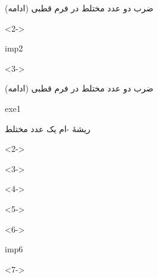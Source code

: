 \def\EMtitlesize{26}\def\EMtitleskip{31}
\begin{frame}{ضرب دو عدد مختلط در فرم قطبی (ادامه)}
\begin{uncoverenv}<2->
\end{uncoverenv}
\EMgap
\begin{EMbox}{imp}{2}{}
\begin{uncoverenv}<3->
\end{uncoverenv}
\end{EMbox}
\end{frame}

\def\EMtitlesize{26}\def\EMtitleskip{31}
\begin{frame}{ضرب دو عدد مختلط در فرم قطبی (ادامه)}
\begin{EMbox}{exe}{1}{}
\end{EMbox}
\end{frame}

\def\EMtitlesize{26}\def\EMtitleskip{31}
\begin{frame}{ریشۀ -ام یک عدد مختلط}
\begin{uncoverenv}<2->
\end{uncoverenv}
\EMgap
\begin{uncoverenv}<3->
\end{uncoverenv}
\EMgap
\begin{uncoverenv}<4->
\end{uncoverenv}
\EMgap
\begin{uncoverenv}<5->
\end{uncoverenv}
\EMgap
\begin{uncoverenv}<6->
\end{uncoverenv}
\EMgap
\begin{EMbox}{imp}{6}{}
\begin{uncoverenv}<7->
\end{uncoverenv}
\end{EMbox}
\end{frame}

